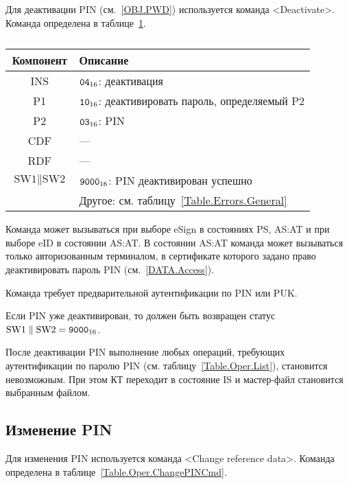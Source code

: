 Для деактивации PIN (см.~\ref{OBJ.PWD}) используется команда <Deactivate>.
Команда определена в таблице~\ref{Table.Oper.DeactivatePINCmd}.

\begin{table}[hbt]
\caption{}\label{Table.Oper.DeactivatePINCmd}
\begin{tabular}{|c|p{14cm}|}
\hline
Компонент & Описание \\
\hline
\hline
INS & $\texttt{04}_{16}$: деактивация\\
\hline
P1 & $\texttt{10}_{16}$: деактивировать пароль, определяемый P2\\
\hline
P2 & $\texttt{03}_{16}$: PIN \\
\hline
CDF &  --- \\
\hline 
\hline
RDF & --- \\
\hline
$\text{SW1} \parallel \text{SW2}$ & 
$\texttt{9000}_{16}$: PIN деактивирован успешно\\
\cline{2-2}
  & Другое: см. таблицу~\ref{Table.Errors.General}\\
\hline
\end{tabular}
\end{table}

Команда может вызываться при выборе eSign в состояниях 
PS, AS:AT и при выборе eID в состоянии AS:AT. 
В состоянии AS:AT команда может вызываться только авторизованным терминалом, 
в сертификате которого задано право деактивировать пароль PIN
(см.~\ref{DATA.Access}).

Команда требует предварительной аутентификации по PIN или PUK. 

Если PIN уже деактивирован, то должен быть возвращен 
статус $\text{SW1} \parallel \text{SW2} = \texttt{9000}_{16}$.

После деактивации PIN выполнение любых операций, 
требующих аутентификации по паролю PIN (см. таблицу~\ref{Table.Oper.List}), 
становится невозможным. При этом КТ переходит в состояние IS и мастер-файл 
становится выбранным файлом. 

\subsection{Изменение PIN}
\label{Oper.Descr.ChangePIN}

Для изменения PIN используется команда <Change reference data>.
Команда определена в таблице~\ref{Table.Oper.ChangePINCmd}.

